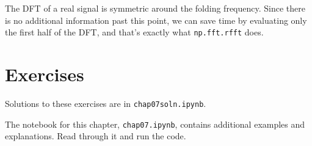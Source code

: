 \documentclass[12pt]{book}
\begin{document}
The DFT of a real signal is symmetric around the folding frequency.
Since there is no additional information past this point, we can
save time by evaluating only the first half of the DFT,
and that's exactly what {\tt np.fft.rfft} does.



\section{Exercises}

Solutions to these exercises are in {\tt chap07soln.ipynb}.


\begin{exercise}
The notebook for this chapter, {\tt chap07.ipynb}, contains
additional examples and explanations.  Read through it and run
the code.
\end{exercise}
\end{document}
